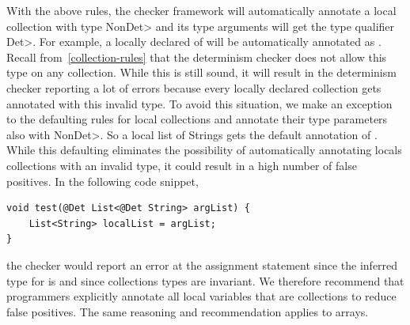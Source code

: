 With the above rules, the checker framework will automatically annotate a local collection with type \<NonDet> and its
type arguments will get the type qualifier \<Det>. For example, a locally declared  of  will be automatically annotated
as . Recall from~\ref{collection-rules} that the determinism checker does not allow this type on
any collection. While this is still sound, it will result in the determinism checker reporting a lot of errors because every locally declared 
collection gets annotated with this invalid type. To avoid this situation, we make an exception to the defaulting rules for local collections
and annotate their type parameters also with \<NonDet>. So a local list of Strings gets the default annotation of . While this defaulting eliminates the possibility of automatically annotating locals collections with an invalid
type, it could result in a high number of false positives. In the following code snippet,
\begin{verbatim}
void test(@Det List<@Det String> argList) {
    List<String> localList = argList;
}    
\end{verbatim}
the checker would report an error at the assignment statement since the inferred type for  is 
 and since collections types are invariant.
We therefore recommend that programmers explicitly annotate
all local variables that are collections to reduce false positives. The same reasoning and recommendation applies to arrays.

